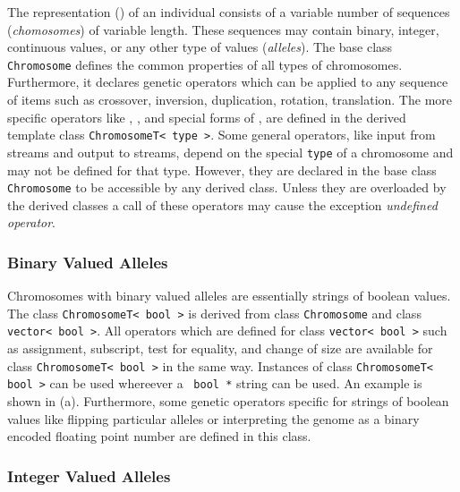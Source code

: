 The representation (\emph{}) of an individual consists of a
variable number of sequences (\emph{chomosomes}) of variable length.
These sequences may contain binary, integer, continuous values, or any
other type of values (\emph{alleles}). The base class
\verb+Chromosome+ defines the common properties of all types of
chromosomes.  Furthermore, it declares genetic operators which can be
applied to any sequence of items such as crossover, inversion,
duplication, rotation, translation.  The more specific operators like
, , and special forms of
, are defined in the derived template class
\texttt{ChromosomeT< type >}. Some general operators, like input from
streams and output to streams, depend on the special \texttt{type} of
a chromosome and may not be defined for that type.  However, they are
declared in the base class \verb+Chromosome+ to be accessible by any
derived class.  Unless they are overloaded by the derived classes a
call of these operators may cause the exception \emph{undefined
operator}.


        \subsubsection{Binary Valued Alleles}

Chromosomes with binary valued alleles are essentially strings of
boolean values. The class \texttt{ChromosomeT< bool >} is
derived from class \verb+Chromosome+ and class \verb+vector< bool >+.
All operators which are defined for class \verb+vector< bool >+ such
as assignment, subscript, test for equality, and change of size are
available for class \verb+ChromosomeT< bool >+ in the same way.
Instances of class \verb+ChromosomeT< bool >+ can be used whereever a
\cpp\ \verb+bool *+ string can be used. An example is shown in
 (a). Furthermore, some genetic
operators specific for strings of boolean values like flipping
particular alleles or interpreting the genome as a binary encoded
floating point number are defined in this class.


        \subsubsection{Integer Valued Alleles}

